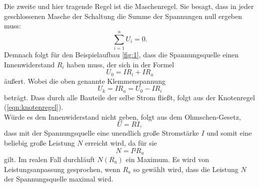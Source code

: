 Die zweite und hier tragende Regel ist die Maschenregel.
Sie besagt, dass in jeder geschlossenen Masche der Schaltung die Summe der Spannungen null ergeben muss:
\begin{equation}
  \sum_{i=1}^n U_i = 0.
  \label{eqn:maschenregel}
\end{equation}
Demnach folgt für den Beispielaufbau \ref{fig:1}, dass die Spannungsquelle einen Innenwiderstand $R_i$ haben muss, der sich in der Formel
\begin{equation}
  U_0 = IR_i + IR_a
\end{equation}
äußert.
Wobei die oben genannte Klemmenspannung
\begin{equation}
  U_k = IR_a = U_0 - IR_i
\end{equation}
beträgt.
Dass durch alle Bauteile der selbe Strom fließt, folgt aus der Knotenregel (\ref{eqn:knotenregel}).\\
Würde es den Innenwiderstand nicht geben, folgt aus dem Ohmschen-Gesetz,
\begin{equation}
  U = RI,
\end{equation}
dass mit der Spannungsquelle eine unendlich große Stromstärke $I$ und somit eine beliebig große Leistung $N$ erreicht wird, da für sie
\begin{equation}
  N = I²R_a
\end{equation}
gilt.
Im realen Fall durchläuft $N(R_a)$ ein Maximum.
Es wird von Leistungsanpassung gesprochen, wenn $R_a$ so gewählt wird, dass die Leistung $N$ der Spannungsquelle maximal wird.
